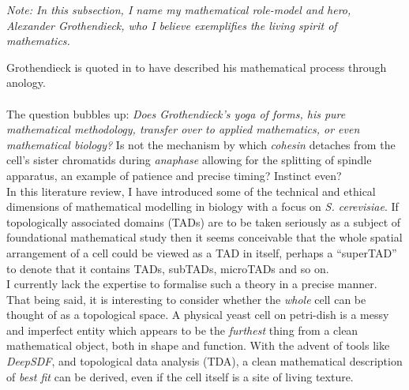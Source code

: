 \textit{Note: In this subsection, I name my mathematical role-model and hero, \\
Alexander Grothendieck, who I believe exemplifies the living spirit of mathematics.}

Grothendieck is quoted in \cite{mclarty2007rising} to have described 
his mathematical process through anology.
\\

\\

The question bubbles up: \textit{Does Grothendieck's \textit{yoga} of forms, 
his pure mathematical methodology,
transfer over to applied mathematics, or even mathematical biology?}
Is not the mechanism by which \textit{cohesin} detaches from the cell's sister 
chromatids during \textit{anaphase} allowing for the splitting of 
spindle apparatus, an example of patience and precise timing? Instinct even?
\\

In this literature review, I have introduced some of the technical 
and ethical dimensions of mathematical modelling in biology with a focus
on \textit{S. cerevisiae}. If topologically associated domains (TADs)
are to be taken seriously as a subject of foundational mathematical study then it 
seems conceivable that the whole spatial arrangement of a cell could 
be viewed as a TAD in itself, perhaps a ``superTAD'' to denote 
that it contains TADs, subTADs, microTADs and so on.
\\

I currently lack the expertise to formalise 
such a theory in a precise manner. That being said, 
it is interesting to consider whether the \textit{whole}
cell can be thought of as a topological space. A physical
yeast cell on petri-dish is a messy and imperfect 
entity which appears to be the \textit{furthest} thing from 
a clean mathematical object, both in shape and function.
With the advent of tools like \textit{DeepSDF}, and topological 
data analysis (TDA), a clean mathematical description
of \textit{best fit} can be derived, even if the cell itself 
is a site of living texture. 
\\

